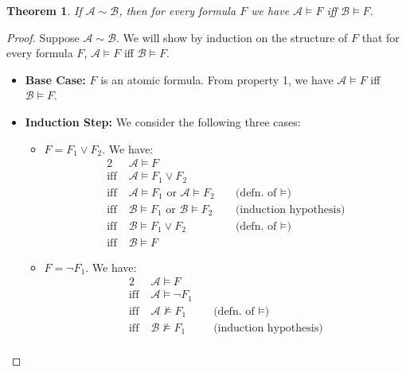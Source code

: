 \documentclass[
  12pt,
  oneside]{article}
\newtheorem{theorem}{Theorem}
\theoremstyle{definition}
\newcommand\satisfies{\vDash}
\begin{document}
\begin{theorem}
    If $\mathcal{A} \sim \mathcal{B}$, then for every formula $F$ we have $\mathcal{A} \satisfies F$ iff $\mathcal{B} \satisfies F$.
\end{theorem}
\begin{proof}
    Suppose $\mathcal{A} \sim \mathcal{B}$. We will show by induction on the structure of $F$ that for every formula $F$, $\mathcal{A} \satisfies F$ iff $\mathcal{B} \satisfies F$.

    \begin{itemize}
        \item \textbf{Base Case:} $F$ is an atomic formula. From property 1, we have $\mathcal{A} \satisfies F$ iff $\mathcal{B} \satisfies F$.
        \item \textbf{Induction Step:} We consider the following three cases:
        \begin{itemize}
            \item $F = F_1 \lor F_2$. We have:
                \begin{alignat*}{2}
                              &\; \mathcal{A} \satisfies F && \\
                    \text{iff}&\; \mathcal{A} \satisfies F_1 \lor F_2 && \\
                    \text{iff}&\; \mathcal{A} \satisfies F_1 \text{ or } \mathcal{A} \satisfies F_2 &&\; \text{(defn. of } \satisfies \text{)} \\
                    \text{iff}&\; \mathcal{B} \satisfies F_1 \text{ or } \mathcal{B} \satisfies F_2 &&\; \text{(induction hypothesis)} \\
                    \text{iff}&\; \mathcal{B} \satisfies F_1 \lor F_2 &&\; \text{(defn. of } \satisfies \text{)} \\
                    \text{iff}&\; \mathcal{B} \satisfies F &&
                \end{alignat*}
            \item $F = \neg F_1$. We have:
                \begin{alignat*}{2}
                              &\; \mathcal{A} \satisfies F && \\
                    \text{iff}&\; \mathcal{A} \satisfies \neg F_1 && \\
                    \text{iff}&\; \mathcal{A} \not\satisfies F_1 &&\; \text{(defn. of } \satisfies \text{)} \\
                    \text{iff}&\; \mathcal{B} \not\satisfies F_1 &&\; \text{(induction hypothesis)} \\

\end{alignat*}
\end{itemize}
\end{itemize}
\end{proof}
\end{document}
